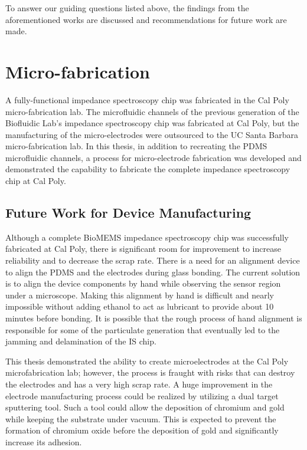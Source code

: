 \par To answer our guiding questions listed above, the findings from the aforementioned works are discussed and recommendations for future work are made.
    


\section{Micro-fabrication}

\par A fully-functional impedance spectroscopy chip was fabricated in the Cal Poly micro-fabrication lab. The microfluidic channels of the previous generation of the Biofluidic Lab's impedance spectroscopy chip was fabricated at Cal Poly, but the manufacturing of the micro-electrodes were outsourced to the UC Santa Barbara micro-fabrication lab. In this thesis, in addition to recreating the PDMS microfluidic channels, a process for micro-electrode fabrication was developed and demonstrated the capability to fabricate the complete impedance spectroscopy chip at Cal Poly.

\subsection*{Future Work for Device Manufacturing}

\par Although a complete BioMEMS impedance spectroscopy chip was successfully fabricated at Cal Poly, there is significant room for improvement to increase reliability and to decrease the scrap rate. There is a need for an alignment device to align the PDMS and the electrodes during glass bonding. The current solution is to align the device components by hand while observing the sensor region under a microscope. Making this alignment by hand is difficult and nearly impossible without adding ethanol to act as lubricant to provide about 10 minutes before bonding. It is possible that the rough process of hand alignment is responsible for some of the particulate generation that eventually led to the jamming and delamination of the IS chip. 

\par This thesis demonstrated the ability to create microelectrodes at the Cal Poly microfabrication lab; however, the process is fraught with risks that can destroy the electrodes and has a very high scrap rate. A huge improvement in the electrode manufacturing process could be realized by utilizing a dual target sputtering tool. Such a tool could allow the deposition of chromium and gold while keeping the substrate under vacuum. This is expected to prevent the formation of chromium oxide before the deposition of gold and significantly increase its adhesion.  


